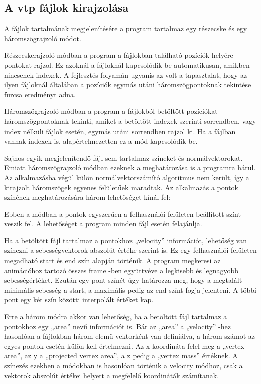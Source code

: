 \subsection{A vtp fájlok kirajzolása}

A fájlok tartalmának megjelenítésére a program tartalmaz 
egy részecske és egy háromszögrajzoló módot.

Részecskerajzoló módban a program 
a fájlokban található pozíciók helyére pontokat rajzol. 
Ez azoknál a fájloknál kapcsolódik be automatikusan, 
amikben nincsenek indexek.
A fejlesztés folyamán ugyanis az volt a tapasztalat, 
hogy az ilyen fájloknál általában a pozíciók 
egymás utáni háromszögpontoknak tekintése furcsa eredményt adna. 

Háromszögrajzoló módban a program 
a fájlokból betöltött pozíciókat háromszögpontoknak tekinti, 
amiket a betöltött indexek szerinti sorrendben, 
vagy index nélküli fájlok esetén, egymás utáni sorrendben rajzol ki. 
Ha a fájlban vannak indexek is, 
alapértelmezetten ez a mód kapcsolódik be.

Sajnos egyik megjelenítendő fájl sem tartalmaz színeket és normálvektorokat. 
Emiatt háromszögrajzoló módban ezeknek a meghatározása is a programra hárul. 
Az alkalmazásba végül külön normálvektorszámító algoritmus nem került, 
így a kirajzolt háromszögek egyenes felületűek maradtak.
\newline
Az alkalmazás a pontok színének meghatározására három lehetőséget kínál fel:
\begin{description}[font=\normalfont\itshape\space]
\item [solid:]
Ebben a módban a pontok egyszerűen 
a felhasználói felületen beállított színt veszik fel. 
A lehetőséget a program minden fájl esetén felajánlja.
\item [velocity:]
Ha a betöltött fájl tartalmaz a pontokhoz {\ttfamily „velocity”} információt, 
lehetőség van színezni a sebességvektorok abszolút értéke szerint is. 
Ez egy felhasználói felületen megadható start és end szín alapján történik. 
A program megkeresi az animációhoz tartozó összes frame -ben együttvéve 
a legkisebb és legnagyobb sebességértéket. 
Ezután egy pont színét úgy határozza meg, 
hogy a megtalált minimális sebesség a start, 
a maximális pedig az end színt fogja jelenteni. 
A többi pont egy két szín közötti interpolált értéket kap.
\item [vertex area, projected vertex area és vertex mass:]
Erre a három módra akkor van lehetőség, 
ha a betöltött fájl tartalmaz a pontokhoz egy {\ttfamily „area”} nevű információt is. 
Bár az {\ttfamily „area”} a {\ttfamily „velocity”} -hez 
hasonlóan a fájlokban három elemű vektorként van definiálva, 
a három számot az egyes pontok esetén külön kell értelmezni. 
Az x koordináta felel meg a {\ttfamily „vertex area”}, 
az y a {\ttfamily „projected vertex area”}, 
a z pedig a {\ttfamily „vertex mass”} értéknek. 
A színezés ezekben a módokban is hasonlóan történik a velocity módhoz, 
csak a vektorok abszolút értékei helyett a megfelelő koordináták számítanak.
\end{description}

